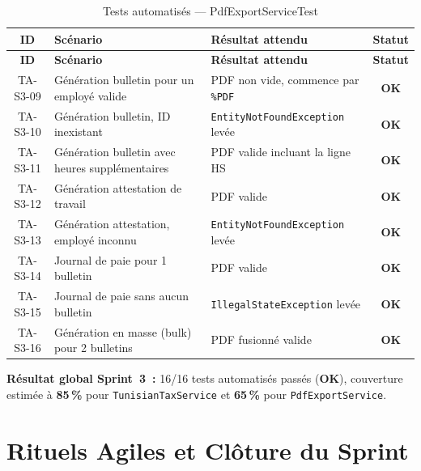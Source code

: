 \renewcommand{\arraystretch}{1.2}
\begin{small}
\begin{xltabular}{\textwidth}{|c|X|p{4cm}|c|}
\hline
{}
\textbf{ID} & \textbf{Scénario} & \textbf{Résultat attendu} & \textbf{Statut} \\ \hline
\endfirsthead \hline
{}
\textbf{ID} & \textbf{Scénario} & \textbf{Résultat attendu} & \textbf{Statut} \\ \hline
\endhead \hline \endfoot \hline
\caption{Tests automatisés --- PdfExportServiceTest}\label{tab:auto-pdf}\endlastfoot
TA-S3-09 & Génération bulletin pour un employé valide
    & PDF non vide, commence par \texttt{\%PDF} & \textcolor{green!60!black}{\textbf{OK}} \\ \hline
TA-S3-10 & Génération bulletin, ID inexistant
    & \texttt{EntityNotFoundException} levée & \textcolor{green!60!black}{\textbf{OK}} \\ \hline
TA-S3-11 & Génération bulletin avec heures supplémentaires
    & PDF valide incluant la ligne HS & \textcolor{green!60!black}{\textbf{OK}} \\ \hline
TA-S3-12 & Génération attestation de travail
    & PDF valide & \textcolor{green!60!black}{\textbf{OK}} \\ \hline
TA-S3-13 & Génération attestation, employé inconnu
    & \texttt{EntityNotFoundException} levée & \textcolor{green!60!black}{\textbf{OK}} \\ \hline
TA-S3-14 & Journal de paie pour 1 bulletin
    & PDF valide & \textcolor{green!60!black}{\textbf{OK}} \\ \hline
TA-S3-15 & Journal de paie sans aucun bulletin
    & \texttt{IllegalStateException} levée & \textcolor{green!60!black}{\textbf{OK}} \\ \hline
TA-S3-16 & Génération en masse (bulk) pour 2 bulletins
    & PDF fusionné valide & \textcolor{green!60!black}{\textbf{OK}} \\ \hline
\end{xltabular}
\end{small}
\renewcommand{\arraystretch}{1.0}

\textbf{Résultat global Sprint~3~:} 16/16 tests automatisés passés
(\textcolor{green!60!black}{\textbf{OK}}), couverture estimée à
\textbf{85\,\%} pour \texttt{TunisianTaxService} et \textbf{65\,\%}
pour \texttt{PdfExportService}.

\section{Rituels Agiles et Clôture du Sprint}
\label{sec:s3-rituels}

